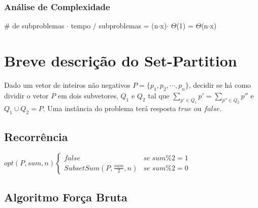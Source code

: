 \documentclass[12pt]{article}
\begin{document}
\begin{algorithm}[H]
\end{algorithm}

\subsubsection{Análise de Complexidade}

\# de subproblemas $\cdot$ tempo $/$ subproblemas = (n$\cdot$x)$\cdot$ $\Theta$(1) = $\Theta$(n$\cdot$x)

\section{Breve descrição do Set-Partition}

Dado um vetor de inteiros não negativos $P = \{p_1, p_2, \cdots, p_n\}$, decidir se há como dividir o vetor $P$ em dois subvetores, $Q_1$ e $Q_2$ tal que $\displaystyle\sum_{p' \in Q_1} p' = \displaystyle\sum_{p'' \in Q_2} p''$ e $Q_1 \cup Q_2 = P$. Uma instância do problema terá resposta $true$ ou $false$.

\subsection{Recorrência}

$opt(P,sum,n)\left\{\begin {matrix}
false & se\;sum\% 2 = 1\\
SubsetSum(P,\frac{sum}{2},n) & se\;sum\% 2 = 0
\end{matrix}\right.$

\subsection{Algoritmo Força Bruta}

\begin{algorithm}[H]
\end{algorithm}
\end{document}

